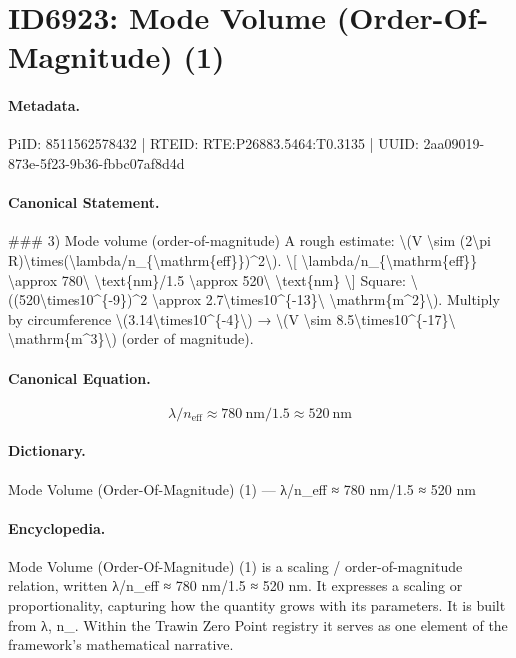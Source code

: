 \section*{ID6923: Mode Volume (Order-Of-Magnitude) (1)}
\paragraph{Metadata.}
PiID: 8511562578432 | RTEID: RTE:P26883.5464:T0.3135 | UUID: 2aa09019-873e-5f23-9b36-fbbc07af8d4d

\paragraph{Canonical Statement.}
\#\#\# 3) Mode volume (order-of-magnitude) A rough estimate: \textbackslash{}(V \textbackslash{}sim (2\textbackslash{}pi R)\textbackslash{}times(\textbackslash{}lambda/n\_\{\textbackslash{}mathrm\{eff\}\})\textasciicircum{}2\textbackslash{}). \textbackslash{}[ \textbackslash{}lambda/n\_\{\textbackslash{}mathrm\{eff\}\} \textbackslash{}approx 780\textbackslash{} \textbackslash{}text\{nm\}/1.5 \textbackslash{}approx 520\textbackslash{} \textbackslash{}text\{nm\} \textbackslash{}] Square: \textbackslash{}((520\textbackslash{}times10\textasciicircum{}\{-9\})\textasciicircum{}2 \textbackslash{}approx 2.7\textbackslash{}times10\textasciicircum{}\{-13\}\textbackslash{} \textbackslash{}mathrm\{m\textasciicircum{}2\}\textbackslash{}). Multiply by circumference \textbackslash{}(3.14\textbackslash{}times10\textasciicircum{}\{-4\}\textbackslash{}) → \textbackslash{}(V \textbackslash{}sim 8.5\textbackslash{}times10\textasciicircum{}\{-17\}\textbackslash{} \textbackslash{}mathrm\{m\textasciicircum{}3\}\textbackslash{}) (order of magnitude).

\paragraph{Canonical Equation.}
\[
\lambda/n_{\mathrm{eff}} \approx 780\ \text{nm}/1.5 \approx 520\ \text{nm}
\]

\paragraph{Dictionary.}
Mode Volume (Order-Of-Magnitude) (1) — λ/n\_eff ≈ 780 nm/1.5 ≈ 520 nm

\paragraph{Encyclopedia.}
Mode Volume (Order-Of-Magnitude) (1) is a scaling / order-of-magnitude relation, written λ/n\_eff ≈ 780 nm/1.5 ≈ 520 nm. It expresses a scaling or proportionality, capturing how the quantity grows with its parameters. It is built from λ, n\_. Within the Trawin Zero Point registry it serves as one element of the framework's mathematical narrative.
